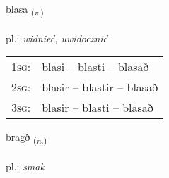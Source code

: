 \documentclass[frontgrid, backgrid]{flacards}\usepackage[]{graphicx}\usepackage[]{xcolor}
\begin{document}
\renewcommand{\flhead}{\vskip5pt \fboxsep=0pt {\small\bfseries\footnotesize Sagnorð | Verb}}
\renewcommand{\fcfoot}{\vskip5pt \fboxsep=0pt \hspace{2pt}{\small\bfseries\footnotesize 2K}}

\renewcommand{\blhead}{\vskip5pt {\small\bfseries\footnotesize Sagnorð | Verb }}
\renewcommand{\bcfoot}{\vskip5pt \hspace{2pt}{\small\bfseries\footnotesize 2K}}


{blasa \small{\textsubscript{(\textit{v.})}} \\[1ex] %
\textphonetic{[plaːsa]} \\
pl.: \emph{widnieć, uwidocznić} \\  [2ex]
\renewcommand*{\arraystretch}{0.8}
\begin{tabular}{p{1cm}l}
\textsc{1sg}: & blasi -- blasti -- blasað \\ 
\textsc{2sg}: & blasir -- blastir -- blasað \\ 
\textsc{3sg}: & blasir -- blasti -- blasað \\ 
\end{tabular}
}

\renewcommand{\flhead}{\vskip5pt \fboxsep=0pt {\small\bfseries\footnotesize Nafnorð | Noun}}
\renewcommand{\fcfoot}{\vskip5pt \fboxsep=0pt \hspace{2pt}{\small\bfseries\footnotesize 2K}}

\renewcommand{\blhead}{\vskip5pt {\small\bfseries\footnotesize Nafnorð | Noun }}
\renewcommand{\bcfoot}{\vskip5pt \hspace{2pt}{\small\bfseries\footnotesize 2K}}


{bragð \small{\textsubscript{(\textit{n.})}} \\[1ex] %
\textphonetic{[praɣð]} \\
pl.: \emph{smak} \\  [2ex]
\renewcommand*{\arraystretch}{0.8}
}
\end{document}
